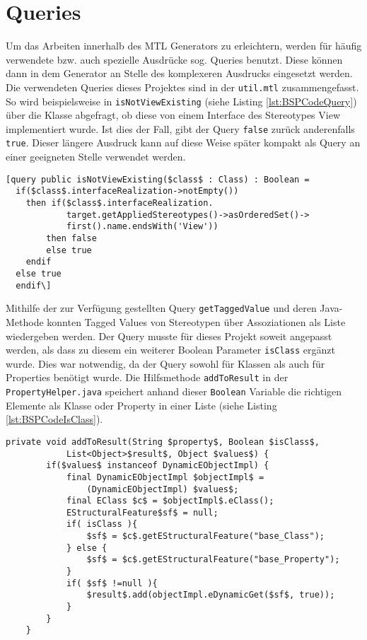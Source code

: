 \section{Queries} \label{Queries}
Um das Arbeiten innerhalb des MTL Generators zu erleichtern, werden für häufig verwendete bzw. auch spezielle Ausdrücke sog. Queries benutzt. Diese können dann in dem Generator an Stelle des komplexeren Ausdrucks eingesetzt werden. Die verwendeten Queries dieses Projektes sind in der \texttt{util.mtl} zusammengefasst. So wird beispielsweise in \texttt{isNotViewExisting} (siehe Listing \ref{lst:BSPCodeQuery}) über die Klasse abgefragt, ob diese von einem Interface des Stereotypes View implementiert wurde. Ist dies der Fall, gibt der Query \texttt{false} zurück anderenfalls \texttt{true}. Dieser längere Ausdruck kann auf diese Weise später kompakt als Query an einer geeigneten Stelle verwendet werden.\\

\lstset{language=mtl}
\begin{lstlisting}[caption={Query für \texttt{isNotViewExisting}}, label={lst:BSPCodeQuery}]
[query public isNotViewExisting($class$ : Class) : Boolean = 
  if($class$.interfaceRealization->notEmpty())
	then if($class$.interfaceRealization.
			target.getAppliedStereotypes()->asOrderedSet()->
			first().name.endsWith('View')) 
		then false 
		else true 
    endif 
  else true 
  endif\]
\end{lstlisting}

Mithilfe der zur Verfügung gestellten Query \texttt{getTaggedValue} und deren Java-Methode konnten Tagged Values von Stereotypen über Assoziationen als Liste wiedergeben werden. Der Query musste für dieses Projekt soweit angepasst werden, als dass zu diesem ein weiterer Boolean Parameter \texttt{isClass} ergänzt wurde. Dies war notwendig, da der Query sowohl für Klassen als auch für Properties benötigt wurde.
Die Hilfsmethode \texttt{addToResult} in der \texttt{PropertyHelper.java} speichert anhand dieser \texttt{Boolean} Variable die richtigen Elemente als Klasse oder Property in einer Liste (siehe Listing \ref{lst:BSPCodeIsClass}).
\lstset{language=gwt}
\begin{lstlisting}[caption={Hilfsmethode \texttt{addToResult} der \texttt{PropertyHelper.java}}, label={lst:BSPCodeIsClass}]
private void addToResult(String $property$, Boolean $isClass$,
			List<Object>$result$, Object $values$) {
		if($values$ instanceof DynamicEObjectImpl) {
			final DynamicEObjectImpl $objectImpl$ = 
				(DynamicEObjectImpl) $values$;
			final EClass $c$ = $objectImpl$.eClass();
			EStructuralFeature$sf$ = null;
			if( isClass ){
				$sf$ = $c$.getEStructuralFeature("base_Class");
			} else {
				$sf$ = $c$.getEStructuralFeature("base_Property");
			}
			if( $sf$ !=null ){
				$result$.add(objectImpl.eDynamicGet($sf$, true));
			}
		}
	}
\end{lstlisting}